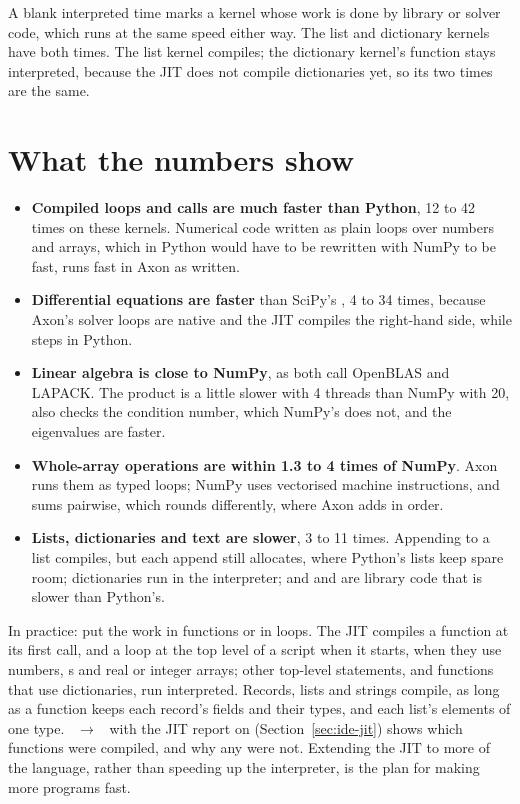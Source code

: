 \documentclass[11pt,a4paper,openany]{report}
\begin{document}
{{A blank interpreted time marks a kernel whose work is done by library or
solver code, which runs at the same speed either way. The list and dictionary
kernels have both times. The list kernel compiles; the dictionary kernel's
function stays interpreted, because the JIT does not compile dictionaries
yet, so its two times are the same.

\section*{What the numbers show}

\begin{itemize}
\item \textbf{Compiled loops and calls are much faster than Python}, 12 to
  42 times on these kernels. Numerical code written as plain loops over
  numbers and arrays, which in Python would have to be rewritten with NumPy
  to be fast, runs fast in Axon as written.
\item \textbf{Differential equations are faster} than SciPy's
  , 4 to 34 times, because Axon's solver loops are native and
  the JIT compiles the right-hand side, while  steps in
  Python.
\item \textbf{Linear algebra is close to NumPy}, as both call OpenBLAS and
  LAPACK. The product is a little slower with 4 threads than NumPy with 20,
   also checks the condition number, which NumPy's
   does not, and the eigenvalues are faster.
\item \textbf{Whole-array operations are within 1.3 to 4 times of NumPy}.
  Axon runs them as typed loops; NumPy uses vectorised machine instructions,
  and sums pairwise, which rounds differently, where Axon adds in order.
\item \textbf{Lists, dictionaries and text are slower}, 3 to 11 times.
  Appending to a list compiles, but each append still allocates, where
  Python's lists keep spare room; dictionaries run in the interpreter; and
   and  are library code that is slower than
  Python's.
\end{itemize}

In practice: put the work in functions or in loops. The JIT compiles a
function at its first call, and a loop at the top level of a script when it
starts, when they use numbers, s and real or integer arrays; other
top-level statements, and functions that use dictionaries, run
interpreted. Records, lists and strings compile, as long as a function
keeps each record's fields and their types, and each list's elements of one
type. ~$\rightarrow$~ with the JIT report on (Section~\ref{sec:ide-jit}) shows which
functions were compiled, and why any were not. Extending the JIT to more of
the language, rather than speeding up the interpreter, is the plan for
making more programs fast.

}}
\end{document}
